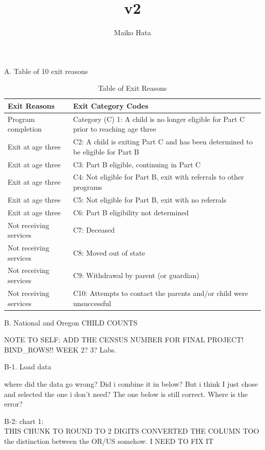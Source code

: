 \documentclass[
  letterpaper,
  DIV=11,
  numbers=noendperiod]{scrartcl}
\title{v2}
\author{Maiko Hata}
\date{}
\begin{document}
\maketitle


A. Table of 10 exit reasons

\begin{longtable}[l]{ll}
\caption{Table of Exit Reasons}\\
\toprule
Exit Reasons & Exit Category Codes\\
\midrule
Program completion & Category (C) 1: A child is no longer eligible for Part C prior to reaching age three \\
Exit at age three & C2: A child is exiting Part C and has been determined to be eligible for Part B \\
Exit at age three & C3: Part B eligible, continuing in Part C  \\
Exit at age three & C4: Not eligible for Part B, exit with referrals to other programs \\
Exit at age three & C5: Not eligible for Part B, exit with no referrals \\
\addlinespace
Exit at age three & C6: Part B eligibility not determined \\
Not receiving services  & C7: Deceased\\
Not receiving services  & C8: Moved out of state \\
Not receiving services  & C9: Withdrawal by parent (or guardian) \\
Not receiving services  & C10: Attempts to contact the parents and/or child were unsuccessful \\
\bottomrule
\end{longtable}

B. National and Oregon CHILD COUNTS

NOTE TO SELF: ADD THE CENSUS NUMBER FOR FINAL PROJECT! BIND\_ROWS!! WEEK
2? 3? Labs.

B-1. Load data

where did the data go wrong? Did i combine it in below? But i think I
just chose and selected the one i don't need? The one below is still
correct. Where is the error?

B-2: chart 1:\\
THIS CHUNK TO ROUND TO 2 DIGITS CONVERTED THE COLUMN TOO the distinction
between the OR/US somehow. I NEED TO FIX IT

\begingroup\fontsize{10.5}{12.5}\selectfont
\end{document}
